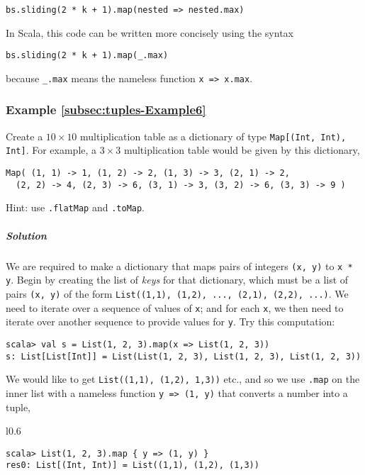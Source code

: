 \begin{lstlisting}
bs.sliding(2 * k + 1).map(nested => nested.max)
\end{lstlisting}
In Scala, this code can be written more concisely using the syntax
\begin{lstlisting}
bs.sliding(2 * k + 1).map(_.max)
\end{lstlisting}
because \lstinline!_.max! means the nameless function \lstinline!x => x.max!.

\subsubsection{Example \label{subsec:tuples-Example6}\ref{subsec:tuples-Example6}}

Create a $10\times10$ multiplication table as a dictionary of type
\lstinline!Map[(Int, Int), Int]!. For example, a $3\times3$ multiplication
table would be given by this dictionary,
\begin{lstlisting}
Map( (1, 1) -> 1, (1, 2) -> 2, (1, 3) -> 3, (2, 1) -> 2,
  (2, 2) -> 4, (2, 3) -> 6, (3, 1) -> 3, (3, 2) -> 6, (3, 3) -> 9 )
\end{lstlisting}

Hint: use \lstinline!.flatMap! and \lstinline!.toMap!.

\subparagraph{Solution}

We are required to make a dictionary that maps pairs of integers \lstinline!(x, y)!
to \lstinline!x * y!. Begin by creating the list of \emph{keys} for
that dictionary, which must be a list of pairs \lstinline!(x, y)!
of the form \lstinline!List((1,1), (1,2), ..., (2,1), (2,2), ...)!.
We need to iterate over a sequence of values of \lstinline!x!; and
for each \lstinline!x!, we then need to iterate over another sequence
to provide values for \lstinline!y!. Try this computation:
\begin{lstlisting}
scala> val s = List(1, 2, 3).map(x => List(1, 2, 3))
s: List[List[Int]] = List(List(1, 2, 3), List(1, 2, 3), List(1, 2, 3))
\end{lstlisting}
We would like to get \lstinline!List((1,1), (1,2), 1,3))! etc., and
so we use \lstinline!.map! on the inner list with a nameless function
\lstinline!y => (1, y)! that converts a number into a tuple,

\begin{wrapfigure}{l}{0.6\columnwidth}%
\vspace{-0.75\baselineskip}
\begin{lstlisting}
scala> List(1, 2, 3).map { y => (1, y) }
res0: List[(Int, Int)] = List((1,1), (1,2), (1,3))
\end{lstlisting}
\vspace{-1.5\baselineskip}
\end{wrapfigure}%

